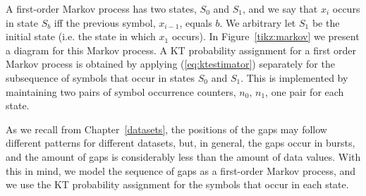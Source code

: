 \vspace{+5pt}
\begin{table}[h]
\begin{minipage}{0.62\textwidth}
A first-order Markov process has two states, $S_0$ and $S_1$, and we say that $x_i$ occurs in state $S_b$ iff the previous symbol, $x_{i-1}$, equals $b$. We arbitrary let $S_1$ be the initial state (i.e. the state in which $x_1$ occurs). In Figure~\ref{tikz:markov} we present a diagram for this Markov process. A KT probability assignment for a first order Markov process is obtained by applying (\ref{eq:ktestimator}) separately for the subsequence of symbols that occur in states $S_0$ and $S_1$. This is implemented by maintaining two pairs of symbol occurrence counters, $n_0$, $n_1$, one pair for each state.

\end{minipage}%
\hspace{0.02\textwidth}
\begin{minipage}{0.32\textwidth}

\end{minipage}%
\end{table}


\vspace{-5pt}
As we recall from Chapter~\ref{datasets}, the positions of the gaps may follow different patterns for different datasets, but, in general, the gaps occur in bursts, and the amount of gaps is considerably less than the amount of data values. With this in mind, we model the sequence of gaps as a first-order Markov process, and we use the KT probability assignment for the symbols that occur in each state.

